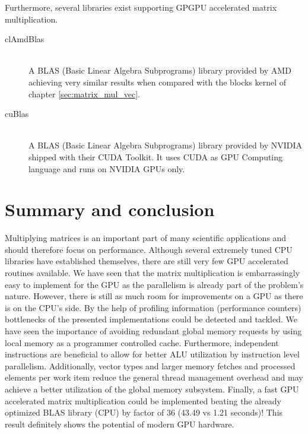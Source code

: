 Furthermore, several libraries exist supporting GPGPU accelerated matrix multiplication.

\begin{description}
   \item[clAmdBlas \cite{cl_amd_blas}] \hfill \\
   A BLAS (Basic Linear Algebra Subprograms) library provided by AMD achieving very similar results when compared with the blocks kernel of chapter \ref{sec:matrix_mul_vec}. 
   \item[cuBlas \cite{cublas}] \hfill \\
   A BLAS (Basic Linear Algebra Subprograms) library provided by NVIDIA shipped with their CUDA Toolkit. It uses CUDA as GPU Computing language and runs on NVIDIA GPUs only.
\end{description}

\section{Summary and conclusion}
Multiplying matrices is an important part of many scientific applications and should therefore focus on performance. Although several extremely tuned CPU libraries have established themselves, there are still very few GPU accelerated routines available. We have seen that the matrix multiplication is embarrassingly easy to implement for the GPU as the parallelism is already part of the problem's nature. However, there is still as much room for improvements on a GPU as there is on the CPU's side. By the help of profiling information (performance counters) bottlenecks of the presented implementations could be detected and tackled. We have seen the importance of avoiding redundant global memory requests by using local memory as a programmer controlled cache. Furthermore, independent instructions are beneficial to allow for better ALU utilization by instruction level parallelism. Additionally, vector types and larger memory fetches and processed elements per work item reduce the general thread management overhead and may achieve a better utilization of the global memory subsystem. Finally, a fast GPU accelerated matrix multiplication could be implemented beating the already optimized BLAS library (CPU) by factor of 36 (43.49 vs 1.21 seconds)! This result definitely shows the potential of modern GPU hardware.
